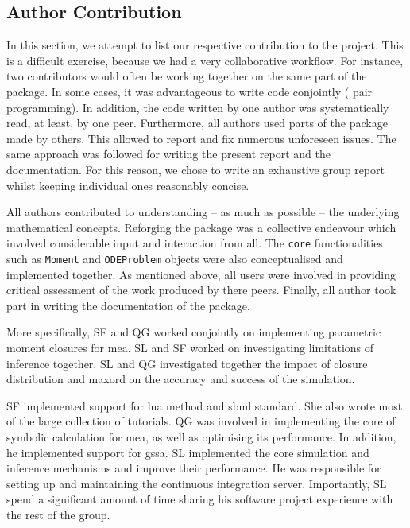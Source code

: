 \subsection{Author Contribution}
In this section, we attempt to list our respective contribution to the project.
This is a difficult exercise, because we had a very collaborative workflow.
For instance,  two contributors would often be working together on the same part of the package.
In some cases, it was advantageous to write code conjointly (\ie{} pair programming).
In addition, the code written by one author was systematically read, at least, by one peer.
Furthermore,  all authors used  parts of the package made by others.
This allowed to report and fix numerous unforeseen issues.
The same approach was followed for writing the present report and the documentation.
For this reason, we chose to write an exhaustive group report whilst keeping individual ones reasonably concise.


All authors contributed to understanding -- as much as possible -- the underlying mathematical concepts.
Reforging the package was a collective endeavour which involved considerable input and interaction from all.
The \texttt{core} functionalities such as \texttt{Moment} and \texttt{ODEProblem} objects were also conceptualised and implemented together.  
As mentioned above, all users were involved in providing critical assessment of the work produced by there peers.
Finally, all author took part in writing the documentation of the package.

More specifically, SF and QG worked conjointly on implementing parametric moment closures for \gls{mea}.
SL and SF worked on  investigating limitations of inference together.
SL and QG investigated together the impact of closure distribution and \gls{maxord} on the accuracy and success of the simulation.


SF implemented support for \gls{lna} method and \gls{sbml} standard.
She also wrote most of the large collection of tutorials.
QG was involved in implementing the core of symbolic calculation for \gls{mea}, as well as optimising its performance.
In addition, he implemented support for \gls{gssa}.
SL implemented the core simulation and inference mechanisms and improve their performance.
He was responsible for setting up and maintaining the continuous integration server.
Importantly, SL spend a significant amount of time sharing his software project experience with the rest of the group.


